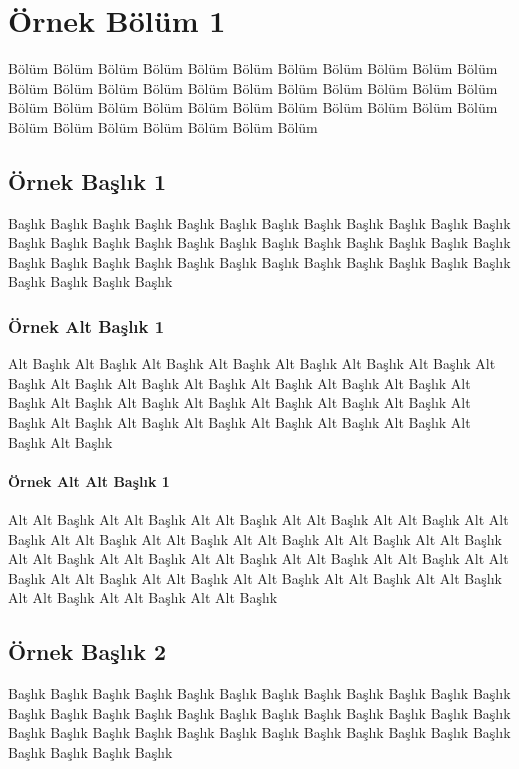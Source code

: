 \chapter{Örnek Bölüm 1}

Bölüm Bölüm Bölüm Bölüm Bölüm Bölüm Bölüm Bölüm
Bölüm Bölüm Bölüm Bölüm Bölüm Bölüm Bölüm Bölüm
Bölüm Bölüm Bölüm Bölüm Bölüm Bölüm Bölüm Bölüm
Bölüm Bölüm Bölüm Bölüm Bölüm Bölüm Bölüm Bölüm
Bölüm Bölüm Bölüm Bölüm Bölüm Bölüm Bölüm Bölüm

\section{Örnek Başlık 1}

Başlık Başlık Başlık Başlık Başlık Başlık Başlık Başlık
Başlık Başlık Başlık Başlık Başlık Başlık Başlık Başlık
Başlık Başlık Başlık Başlık Başlık Başlık Başlık Başlık
Başlık Başlık Başlık Başlık Başlık Başlık Başlık Başlık
Başlık Başlık Başlık Başlık Başlık Başlık Başlık Başlık

\subsection{Örnek Alt Başlık 1}

Alt Başlık Alt Başlık Alt Başlık Alt Başlık Alt Başlık Alt Başlık
Alt Başlık Alt Başlık Alt Başlık Alt Başlık Alt Başlık Alt Başlık
Alt Başlık Alt Başlık Alt Başlık Alt Başlık Alt Başlık Alt Başlık
Alt Başlık Alt Başlık Alt Başlık Alt Başlık Alt Başlık Alt Başlık
Alt Başlık Alt Başlık Alt Başlık Alt Başlık Alt Başlık Alt Başlık

\subsubsection{Örnek Alt Alt Başlık 1}

Alt Alt Başlık Alt Alt Başlık Alt Alt Başlık Alt Alt Başlık Alt Alt Başlık
Alt Alt Başlık Alt Alt Başlık Alt Alt Başlık Alt Alt Başlık Alt Alt Başlık
Alt Alt Başlık Alt Alt Başlık Alt Alt Başlık Alt Alt Başlık Alt Alt Başlık
Alt Alt Başlık Alt Alt Başlık Alt Alt Başlık Alt Alt Başlık Alt Alt Başlık
Alt Alt Başlık Alt Alt Başlık Alt Alt Başlık Alt Alt Başlık Alt Alt Başlık

\section{Örnek Başlık 2}

Başlık Başlık Başlık Başlık Başlık Başlık Başlık Başlık
Başlık Başlık Başlık Başlık Başlık Başlık Başlık Başlık
Başlık Başlık Başlık Başlık Başlık Başlık Başlık Başlık
Başlık Başlık Başlık Başlık Başlık Başlık Başlık Başlık
Başlık Başlık Başlık Başlık Başlık Başlık Başlık Başlık
